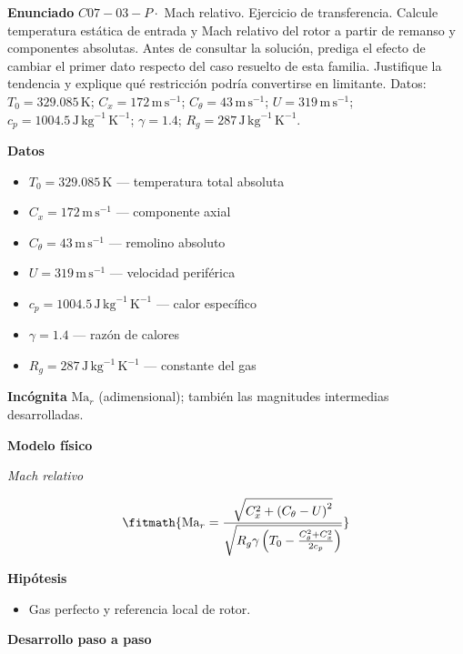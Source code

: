 \documentclass[10pt,openany]{book}
\begin{document}
\noindent\textbf{Enunciado}
\(C07-03-P \cdot\) Mach relativo. Ejercicio de transferencia. Calcule temperatura estática de entrada y Mach relativo del rotor a partir de remanso y componentes absolutas. Antes de consultar la solución, prediga el efecto de cambiar el primer dato respecto del caso resuelto de esta familia. Justifique la tendencia y explique qué restricción podría convertirse en limitante. Datos: \(T_0=329.085\, \mathrm{K}\); \(C_x=172\, \mathrm{m}\,\mathrm{s}^{-1}\); \(C_\theta=43\, \mathrm{m}\,\mathrm{s}^{-1}\); \(U=319\, \mathrm{m}\,\mathrm{s}^{-1}\); \(c_p=1004.5\, \mathrm{J}\,\mathrm{kg}^{-1}\,\mathrm{K}^{-1}\); \(\gamma=1.4\); \(R_g=287\, \mathrm{J}\,\mathrm{kg}^{-1}\,\mathrm{K}^{-1}\).

\noindent\textbf{Datos}
\begin{itemize}
\item $T_0 = 329.085\,\mathrm{K}$ — temperatura total absoluta
\item $C_x = 172\,\mathrm{m}\,\mathrm{s}^{-1}$ — componente axial
\item $C_\theta = 43\,\mathrm{m}\,\mathrm{s}^{-1}$ — remolino absoluto
\item $U = 319\,\mathrm{m}\,\mathrm{s}^{-1}$ — velocidad periférica
\item $c_p = 1004.5\,\mathrm{J}\,\mathrm{kg}^{-1}\,\mathrm{K}^{-1}$ — calor específico
\item $\gamma = 1.4$ — razón de calores
\item $R_g = 287\,\mathrm{J}\,\mathrm{kg}^{-1}\,\mathrm{K}^{-1}$ — constante del gas
\end{itemize}

\noindent\textbf{Incógnita}
$\mathrm{Ma}_r$ (adimensional); también las magnitudes intermedias desarrolladas.

\noindent\textbf{Modelo físico}

\noindent\textit{Mach relativo}

\[
\fitmath{\mathrm{Ma}_r=\frac{\sqrt{C_x^{2} + \left(C_\theta - U\right)^{2}}}{\sqrt{R_g \gamma \left(T_0 - \frac{C_\theta^{2} + C_x^{2}}{2 c_p}\right)}}}
\]

\noindent\textbf{Hipótesis}
\begin{itemize}
\item Gas perfecto y referencia local de rotor.
\end{itemize}

\noindent\textbf{Desarrollo paso a paso}


\end{document}
